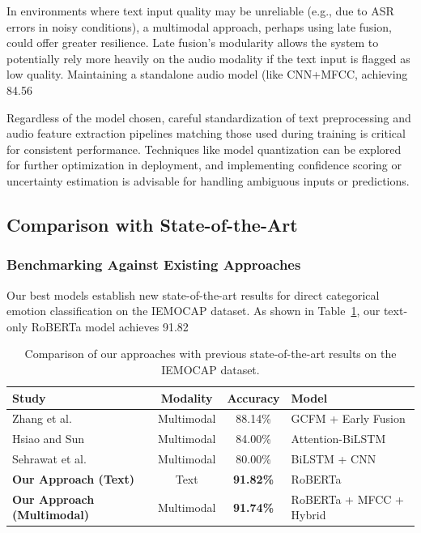 \documentclass[12pt]{article}
\begin{document}
In environments where text input quality may be unreliable (e.g., due to ASR errors in noisy conditions), a multimodal approach, perhaps using late fusion, could offer greater resilience. Late fusion's modularity allows the system to potentially rely more heavily on the audio modality if the text input is flagged as low quality. Maintaining a standalone audio model (like CNN+MFCC, achieving 84.56%

Regardless of the model chosen, careful standardization of text preprocessing and audio feature extraction pipelines matching those used during training is critical for consistent performance. Techniques like model quantization can be explored for further optimization in deployment, and implementing confidence scoring or uncertainty estimation is advisable for handling ambiguous inputs or predictions.

\subsection{Comparison with State-of-the-Art}

\subsubsection{Benchmarking Against Existing Approaches}
Our best models establish new state-of-the-art results for direct categorical emotion classification on the IEMOCAP dataset. As shown in Table~\ref{tab:sota_comparison}, our text-only RoBERTa model achieves 91.82%

\begin{table}[h]
\centering
\begin{tabular}{|l|c|c|l|}
\hline
\textbf{Study} & \textbf{Modality} & \textbf{Accuracy} & \textbf{Model} \\
\hline
Zhang et al.~\cite{zhang2022fine} & Multimodal & 88.14\% & GCFM + Early Fusion \\
\hline
Hsiao and Sun~\cite{hsiao2022attention} & Multimodal & 84.00\% & Attention-BiLSTM \\
\hline
Sehrawat et al.~\cite{sehrawat2023deception} & Multimodal & 80.00\% & BiLSTM + CNN \\
\hline
\textbf{Our Approach (Text)} & Text & \textbf{91.82\%} & RoBERTa \\
\hline
\textbf{Our Approach (Multimodal)} & Multimodal & \textbf{91.74\%} & RoBERTa + MFCC + Hybrid \\
\hline
\end{tabular}
\caption{Comparison of our approaches with previous state-of-the-art results on the IEMOCAP dataset.}
\label{tab:sota_comparison}
\end{table}
\end{document}
